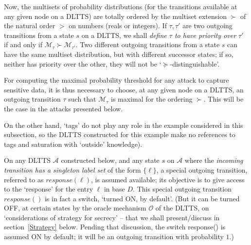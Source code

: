 \documentclass[pdflatex]{article}
\def \A {{\mathcal{A}}}
\def \M {{\mathcal{M}}}
\def \o {{\mathcal{O}}}
\begin{document}
\vspace*{1mm}
Now, the multisets of probability distributions (for the transitions available  at any given
node on a DLTTS) are totally ordered by the multiset extension $\succ$ of the natural
order $>$ on  numbers (reals or integers). If $\tau, \tau'$ are two outgoing transitions
from a state $s$ on a DLTTS, we shall {\em define $\tau$ to have
  priority over $\tau'$} if and only if   $\M_{\tau} \succ \M_{\tau'}$.
Two different outgoing transitions from a state $s$ can have  the same multiset
distribution, but with different successor states; if so,  neither has priority
over the other, they will not be `$\succeq$-distinguishable'.

For computing the maximal probability threshold for any attack to capture sensitive
data, it is thus necessary to choose, at any given node on a DLTTS, an outgoing transition
$\tau$ such that $\M_{\tau}$ is maximal for the ordering $\succ$. This will be the
case in the attacks presented below.

On the other hand, `tags'  do not play any role  in the example considered in this
subsection, so the DLTTS constructed for this example make no references to tags
and saturation with `outside' knowledge). 

\vspace*{0.3mm}
On any DLTTS $\A$ constructed below, and any state $s$ on $\A$ where the 
{\em incoming transition has a singleton label set} of the form $\{ \ell \}$, a special
outgoing transition,  referred to as  $response(\ell)$, is assumed  available; its objective
is to give access to the `response'  for the entry $\ell$ in base $D$. This special outgoing
transition $response()$  is in fact a switch, `turned ON, by default'.  (But it can be turned
OFF, at certain states  by the oracle mechanism $\o$ of the DLTTS,  on `considerations of 
strategy for secrecy' -- that we shall present/discuss in section~\ref{Strategy} below.
Pending that discussion, the switch  response() is assumed ON by default; it will be 
an outgoing transition with probability $1$.)
\end{document}

